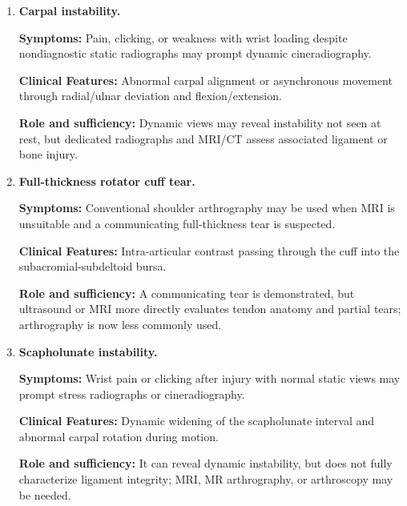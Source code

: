 \begin{enumerate}[leftmargin=*,itemsep=0.45em,topsep=0.4em]
\item \textbf{Carpal instability.}\par\noindent\textbf{Symptoms:} Pain, clicking, or weakness with wrist loading despite nondiagnostic static radiographs may prompt dynamic cineradiography.\par\noindent\textbf{Clinical Features:} Abnormal carpal alignment or asynchronous movement through radial/ulnar deviation and flexion/extension.\par\noindent\textbf{Role and sufficiency:} Dynamic views may reveal instability not seen at rest, but dedicated radiographs and MRI/CT assess associated ligament or bone injury.
\item \textbf{Full-thickness rotator cuff tear.}\par\noindent\textbf{Symptoms:} Conventional shoulder arthrography may be used when MRI is unsuitable and a communicating full-thickness tear is suspected.\par\noindent\textbf{Clinical Features:} Intra-articular contrast passing through the cuff into the subacromial-subdeltoid bursa.\par\noindent\textbf{Role and sufficiency:} A communicating tear is demonstrated, but ultrasound or MRI more directly evaluates tendon anatomy and partial tears; arthrography is now less commonly used.
\item \textbf{Scapholunate instability.}\par\noindent\textbf{Symptoms:} Wrist pain or clicking after injury with normal static views may prompt stress radiographs or cineradiography.\par\noindent\textbf{Clinical Features:} Dynamic widening of the scapholunate interval and abnormal carpal rotation during motion.\par\noindent\textbf{Role and sufficiency:} It can reveal dynamic instability, but does not fully characterize ligament integrity; MRI, MR arthrography, or arthroscopy may be needed.
\end{enumerate}


